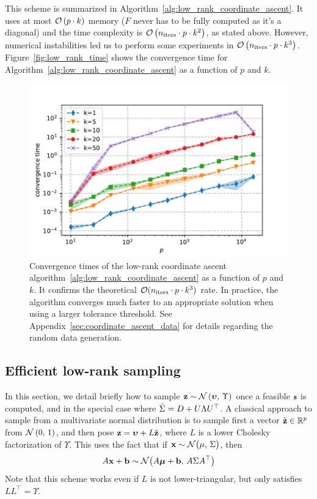 This scheme is summarized in Algorithm~\ref{alg:low_rank_coordinate_ascent}.
It uses at most $\mathcal{O}\left( p \cdot k \right)$ memory ($F$ never has to be fully computed as it's a diagonal)
and the time complexity is $\mathcal{O}\left( n_\text{iters} \cdot p \cdot k^2 \right)$, as stated above.
However, numerical instabilities led us to perform some experiments in $\mathcal{O}\left( n_\text{iters} \cdot p \cdot k^3 \right)$.
Figure~\ref{fig:low_rank_time} shows the convergence time for Algorithm~\ref{alg:low_rank_coordinate_ascent} as
a function of $p$ and $k$.
\begin{figure}
    \centering
    \includegraphics[width=0.8\linewidth, height=0.5\linewidth]{figures/low_rank_times.pdf}
    \caption{
        Convergence times of the low-rank coordinate ascent algorithm~\ref{alg:low_rank_coordinate_ascent}
        as a function of $p$ and $k$.
        It confirms the theoretical $\mathcal{O}(n_{\text{iters}} \cdot p \cdot k^3)$ rate.
        In practice,
        the algorithm converges much faster to an appropriate solution when using a larger tolerance threshold.
        See Appendix~\ref{sec:coordinate_ascent_data} for details regarding the random data generation.
    }
    \label{fig:low_rank_times}
\end{figure}

\subsection{Efficient low-rank sampling}\label{subsec:low_rank_sampling}

In this section, we detail briefly how to sample $\mathbf{z} \sim \mathcal{N}\left( \bm{\upsilon},\, \Upsilon \right)$ once
a feasible $\mathbf{s}$ is computed, and in the special case where $\hat{\Sigma} = D + U\Lambda U^\top$.
A classical approach to sample from a multivariate normal distribution is to sample first a vector
$\tilde{\mathbf{z}} \in \mathbb{R}^p$ from $\mathcal{N}\left( 0,\, 1 \right)$,
and then pose $\mathbf{z} = \bm{\upsilon} + L\tilde{\mathbf{z}}$,
where $L$ is a lower Cholesky factorization of $\Upsilon$.
This uses the fact that if $\mathbf{x} \sim \mathcal{N}\big( \mu,\, \Sigma \big)$,
then
\begin{equation}\label{eq:affine_transformation}
    A\mathbf{x} + \mathbf{b} \sim \mathcal{N}\big( A\bm{\mu} + \mathbf{b},\, A\Sigma A^\top \big)
\end{equation}
Note that this scheme works even if $L$ is not lower-triangular,
but only satisfies $LL^\top = \Upsilon$.

